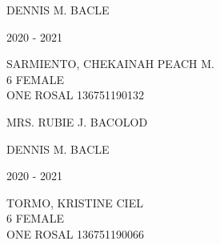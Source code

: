 \documentclass{article}
\begin{document}
{{\begin{multicols}{2}
\begin{flushright}
\end{flushright}  
\vspace*{1.5mm}
\hspace*{3em} DENNIS M. BACLE
\end{multicols} 
\newpage
\begin{multicols}{2}
\phantom{u}
\columnbreak
\vspace*{-3mm}
\begin{center}
\phantom{school year:} \hspace*{6em} 2020 - 2021 
\end{center} 
\vspace{4mm} 
\phantom{Name:} \hspace*{5em} SARMIENTO, CHEKAINAH PEACH M. \\[2.5mm] %
\phantom{Age} \hspace*{8em} 6  \phantom{Sex} \hspace*{12em} FEMALE \\[2.5mm] %
\phantom{Grade} \hspace*{3em} ONE \phantom{Section} \hspace*{4em} ROSAL \phantom{LRN} \hspace*{4em} 136751190132 \\
\vspace*{25mm}
\begin{flushright}
MRS. RUBIE J. BACOLOD \hspace*{-1.5em}
\end{flushright}  
\vspace*{1.5mm}
\hspace*{3em} DENNIS M. BACLE
\end{multicols} 
\newpage
\begin{multicols}{2}
\phantom{u}
\columnbreak
\vspace*{-3mm}
\begin{center}
\phantom{school year:} \hspace*{6em} 2020 - 2021 
\end{center} 
\vspace{4mm} 
\phantom{Name:} \hspace*{5em} TORMO, KRISTINE CIEL \\[2.5mm] %
\phantom{Age} \hspace*{8em} 6  \phantom{Sex} \hspace*{12em} FEMALE \\[2.5mm] %
\phantom{Grade} \hspace*{3em} ONE \phantom{Section} \hspace*{4em} ROSAL \phantom{LRN} \hspace*{4em} 136751190066 \\

\end{multicols}}}
\end{document}
